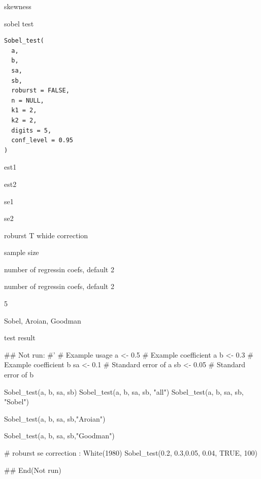 \documentclass[a4paper]{book}
\begin{document}
%
\begin{Value}
skewness
\end{Value}
%
\begin{Description}
sobel test
\end{Description}
%
\begin{Usage}
\begin{verbatim}
Sobel_test(
  a,
  b,
  sa,
  sb,
  roburst = FALSE,
  n = NULL,
  k1 = 2,
  k2 = 2,
  digits = 5,
  conf_level = 0.95
)
\end{verbatim}
\end{Usage}
%
\begin{Arguments}
\begin{ldescription}
\item[\code{a}] est1

\item[\code{b}] est2

\item[\code{sa}] se1

\item[\code{sb}] se2

\item[\code{roburst}] roburst T whide correction

\item[\code{n}] sample size

\item[\code{k1}] number of regressin coefs, default 2

\item[\code{k2}] number of regressin coefs, default 2

\item[\code{digits}] 5

\item[\code{type}] Sobel, Aroian, Goodman
\end{ldescription}
\end{Arguments}
%
\begin{Value}
test result
\end{Value}
%
\begin{Examples}
\begin{ExampleCode}

\#\# Not run: 
#'
# Example usage
a <- 0.5  # Example coefficient a
b <- 0.3  # Example coefficient b
sa <- 0.1 # Standard error of a
sb <- 0.05 # Standard error of b

Sobel_test(a, b, sa, sb)
Sobel_test(a, b, sa, sb, "all")
Sobel_test(a, b, sa, sb, "Sobel")

Sobel_test(a, b, sa, sb,"Aroian")

Sobel_test(a, b, sa, sb,"Goodman")


# roburst se correction : White(1980)
Sobel_test(0.2, 0.3,0.05, 0.04, TRUE, 100)


## End(Not run)

\end{ExampleCode}
\end{Examples}
\end{document}
